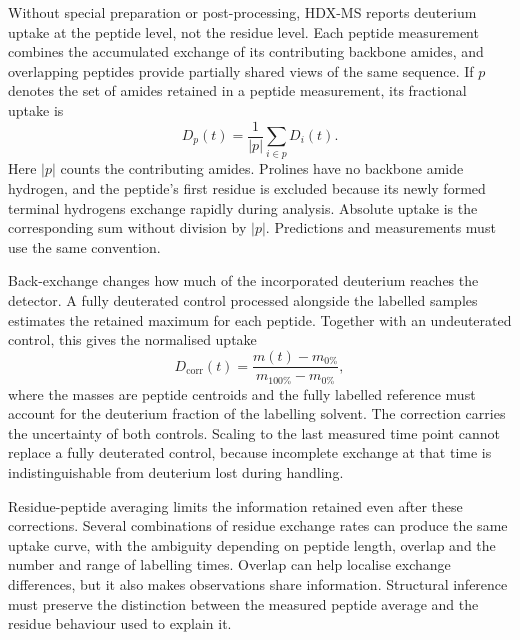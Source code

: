Without special preparation or post-processing, HDX-MS reports deuterium uptake at the peptide level, not the residue level. Each peptide measurement combines the accumulated exchange of its contributing backbone amides, and overlapping peptides provide partially shared views of the same sequence.\supercite{leeInterpretingHydrogenDeuteriumExchange2021} If $p$ denotes the set of amides retained in a peptide measurement, its fractional uptake is
\begin{equation}
    D_p(t)=\frac{1}{|p|}\sum_{i\in p}D_i(t).
    \label{eq:bg-peptide-uptake}
\end{equation}
Here $|p|$ counts the contributing amides. Prolines have no backbone amide hydrogen, and the peptide's first residue is excluded because its newly formed terminal hydrogens exchange rapidly during analysis. Absolute uptake is the corresponding sum without division by $|p|$. Predictions and measurements must use the same convention.\supercite{bradshawInterpretationHDXData2020}

Back-exchange changes how much of the incorporated deuterium reaches the detector. A fully deuterated control processed alongside the labelled samples estimates the retained maximum for each peptide. Together with an undeuterated control, this gives the normalised uptake
\begin{equation}
    D_{\text{corr}}(t)=
    \frac{m(t)-m_{0\%}}{m_{100\%}-m_{0\%}},
    \label{eq:bg-back-exchange}
\end{equation}
where the masses are peptide centroids and the fully labelled reference must account for the deuterium fraction of the labelling solvent.\supercite{massonRecommendationsPerformingInterpreting2019} The correction carries the uncertainty of both controls. Scaling to the last measured time point cannot replace a fully deuterated control, because incomplete exchange at that time is indistinguishable from deuterium lost during handling.

Residue-peptide averaging limits the information retained even after these corrections. Several combinations of residue exchange rates can produce the same uptake curve, with the ambiguity depending on peptide length, overlap and the number and range of labelling times.\supercite{skinnerEstimatingConstraintsProtection2019} Overlap can help localise exchange differences, but it also makes observations share information. Structural inference must preserve the distinction between the measured peptide average and the residue behaviour used to explain it.

